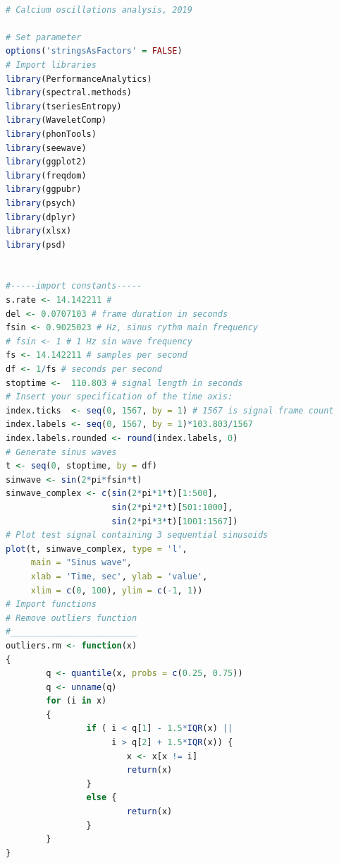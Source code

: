 \documentclass{biophys-new}
\begin{document}
\begin{lstlisting}[language=R]

# Calcium oscillations analysis, 2019

# Set parameter
options('stringsAsFactors' = FALSE)
# Import libraries
library(PerformanceAnalytics)
library(spectral.methods)
library(tseriesEntropy)
library(WaveletComp)
library(phonTools)
library(seewave)
library(ggplot2)
library(freqdom)
library(ggpubr)
library(psych)
library(dplyr)
library(xlsx)
library(psd)


#-----import constants-----
s.rate <- 14.142211 #
del <- 0.0707103 # frame duration in seconds
fsin <- 0.9025023 # Hz, sinus rythm main frequency
# fsin <- 1 # 1 Hz sin wave frequency
fs <- 14.142211 # samples per second
df <- 1/fs # seconds per second
stoptime <-  110.803 # signal length in seconds
# Insert your specification of the time axis:
index.ticks  <- seq(0, 1567, by = 1) # 1567 is signal frame count
index.labels <- seq(0, 1567, by = 1)*103.803/1567
index.labels.rounded <- round(index.labels, 0)
# Generate sinus waves
t <- seq(0, stoptime, by = df)
sinwave <- sin(2*pi*fsin*t)
sinwave_complex <- c(sin(2*pi*1*t)[1:500],
                     sin(2*pi*2*t)[501:1000],
                     sin(2*pi*3*t)[1001:1567])
# Plot test signal containing 3 sequential sinusoids
plot(t, sinwave_complex, type = 'l',
     main = "Sinus wave",
     xlab = 'Time, sec', ylab = 'value',
     xlim = c(0, 100), ylim = c(-1, 1))
# Import functions
# Remove outliers function
#_________________________
outliers.rm <- function(x)
{
        q <- quantile(x, probs = c(0.25, 0.75))
        q <- unname(q)
        for (i in x)
        {
                if ( i < q[1] - 1.5*IQR(x) ||
                     i > q[2] + 1.5*IQR(x)) {
                        x <- x[x != i]
                        return(x)
                }
                else {
                        return(x)
                }
        }
}


\end{lstlisting}
\end{document}
